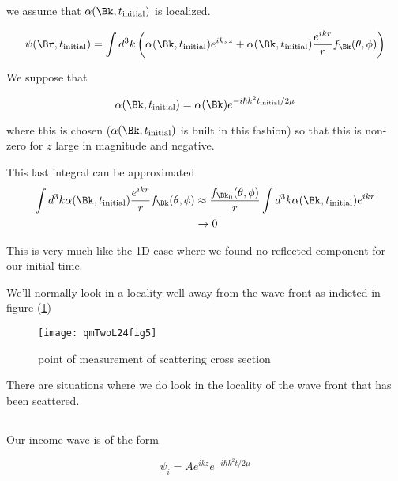 we assume that $\alpha(\Bk, t_{\text{initial}})$ is localized.

\begin{equation}\label{eqn:qmTwoL24:150}
\psi(\Br, t_{\text{initial}}) =
\int d^3k
\left(
\alpha(\Bk, t_{\text{initial}})
e^{i k_z z}
+
\alpha(\Bk, t_{\text{initial}}) \frac{e^{i k r}}{r} f_\Bk(\theta, \phi)
\right)
\end{equation}

We suppose that

\begin{equation}\label{eqn:qmTwoL24:170}
\alpha(\Bk, t_{\text{initial}}) = \alpha(\Bk) e^{-i \hbar k^2 t_{\text{initial}}/ 2\mu}
\end{equation}

where this is chosen ($\alpha(\Bk, t_{\text{initial}})$ is built in this fashion) so that this is non-zero for $z$ large in magnitude and negative.

This last integral can be approximated
\begin{equation}\label{eqn:qmTwoL24:190}
\begin{aligned}
\int d^3k
\alpha(\Bk, t_{\text{initial}}) \frac{e^{i k r}}{r} f_\Bk(\theta, \phi)
&\approx
\frac{f_{\Bk_0}(\theta, \phi)}{r}
\int d^3k
\alpha(\Bk, t_{\text{initial}}) e^{i k r} \\
&\rightarrow 0
\end{aligned}
\end{equation}

This is very much like the 1D case where we found no reflected component for our initial time.

We'll normally look in a locality well away from the wave front as indicted in figure (\ref{fig:qmTwoL24:qmTwoL24fig5})

\begin{figure}[htp]
   \centering
   \texttt{[image: qmTwoL24fig5]}
   \caption{point of measurement of scattering cross section}\label{fig:qmTwoL24:qmTwoL24fig5}
\end{figure}

There are situations where we do look in the locality of the wave front that has been scattered.

\subsection{}

Our income wave is of the form

\begin{equation}\label{eqn:qmTwoL24:210}
\psi_i = A e^{i k z} e^{-i \hbar k^2 t/2 \mu}
\end{equation}

